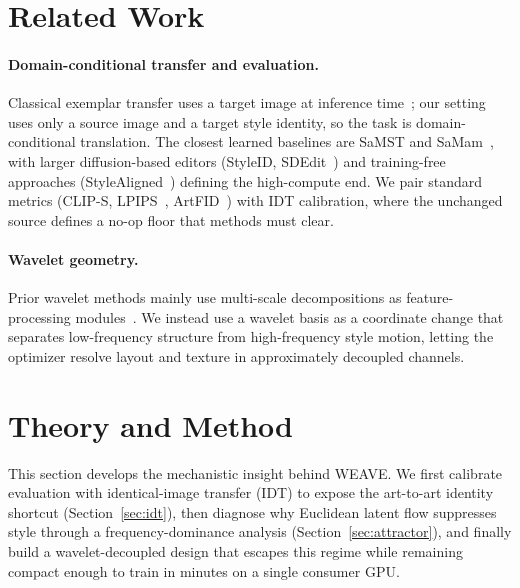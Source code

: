 \documentclass[letterpaper]{article}
\begin{document}
\section{Related Work}
\label{sec:related}

\paragraph{Domain-conditional transfer and evaluation.}
Classical exemplar transfer uses a target image at inference time~\cite{gatys2015neural,gatys2016image,huang2017adain,li2017universal}; our setting uses only a source image and a target style identity, so the task is domain-conditional translation.
The closest learned baselines are SaMST and SaMam~\cite{liu2024samst,liu2024samam}, with larger diffusion-based editors (StyleID, SDEdit~\cite{meng2021sdedit,chung2024styleid}) and training-free approaches (StyleAligned~\cite{gal2022stylealigned}) defining the high-compute end.
We pair standard metrics (CLIP-S, LPIPS~\cite{zhang2018lpips}, ArtFID~\cite{wright2022artfid}) with IDT calibration, where the unchanged source defines a no-op floor that methods must clear.

\paragraph{Wavelet geometry.}
Prior wavelet methods mainly use multi-scale decompositions as feature-processing modules~\cite{daubechies1992ten,phung2023wavelet}.
We instead use a wavelet basis as a coordinate change that separates low-frequency structure from high-frequency style motion, letting the optimizer resolve layout and texture in approximately decoupled channels.

\section{Theory and Method}
\label{sec:method}

This section develops the mechanistic insight behind WEAVE. We first calibrate evaluation with identical-image transfer (IDT) to expose the art-to-art identity shortcut (Section~\ref{sec:idt}), then diagnose why Euclidean latent flow suppresses style through a frequency-dominance analysis (Section~\ref{sec:attractor}), and finally build a wavelet-decoupled design that escapes this regime while remaining compact enough to train in minutes on a single consumer GPU.
\end{document}
